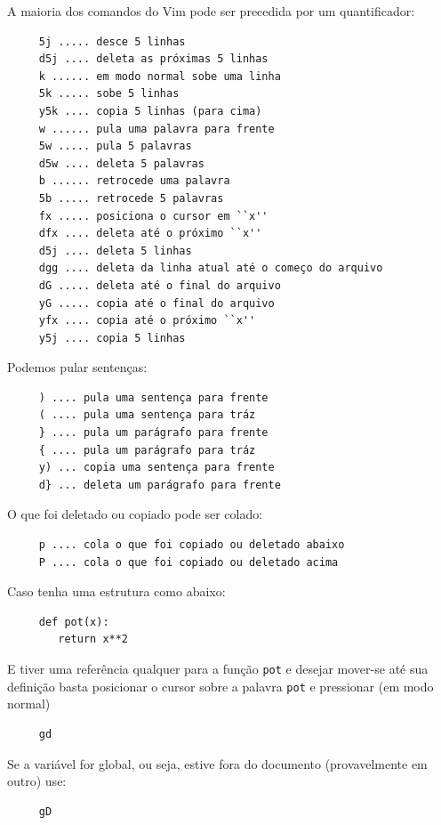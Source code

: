 \documentclass[10pt,a4paper,openany]{book}
\begin{document}
A maioria dos comandos do Vim pode ser precedida por um quantificador:

\begin{verbatim}
     5j ..... desce 5 linhas
     d5j .... deleta as próximas 5 linhas
     k ...... em modo normal sobe uma linha
     5k ..... sobe 5 linhas
     y5k .... copia 5 linhas (para cima)
     w ...... pula uma palavra para frente
     5w ..... pula 5 palavras
     d5w .... deleta 5 palavras
     b ...... retrocede uma palavra
     5b ..... retrocede 5 palavras
     fx ..... posiciona o cursor em ``x''
     dfx .... deleta até o próximo ``x''
     d5j .... deleta 5 linhas
     dgg .... deleta da linha atual até o começo do arquivo
     dG ..... deleta até o final do arquivo
     yG ..... copia até o final do arquivo
     yfx .... copia até o próximo ``x''
     y5j .... copia 5 linhas
\end{verbatim}

Podemos pular sentenças:

\begin{verbatim}
     ) .... pula uma sentença para frente
     ( .... pula uma sentença para tráz
     } .... pula um parágrafo para frente
     { .... pula um parágrafo para tráz
     y) ... copia uma sentença para frente
     d} ... deleta um parágrafo para frente
\end{verbatim}

O que foi deletado ou copiado pode ser colado:

\begin{verbatim}
     p .... cola o que foi copiado ou deletado abaixo
     P .... cola o que foi copiado ou deletado acima
\end{verbatim}

Caso tenha uma estrutura como abaixo:

\begin{verbatim}
     def pot(x):
        return x**2
\end{verbatim}

E tiver uma referência qualquer para a função \verb+pot+ e desejar
mover-se até sua definição basta posicionar o cursor sobre a palavra
\verb+pot+ e pressionar (em modo normal)

\begin{verbatim}
     gd
\end{verbatim}

Se a variável for global, ou seja, estive fora do documento
(provavelmente em outro) use:

\begin{verbatim}
     gD
\end{verbatim}
\end{document}
